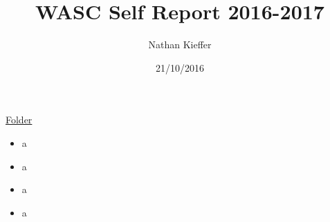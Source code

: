 \documentclass[draft]{report}
\title{WASC Self Report 2016-2017}
\author{Nathan Kieffer}
\date{21/10/2016}
\begin{document}
\AddToShipoutPicture*{\BackgroundPic}
\maketitle


\href{https://drive.google.com/a/cmis.ac.th/folderview?id=0ByVFfrm0zfolWE0yenprdktGVlk&usp=sharing}{Folder}
\begin{itemize}
\item a
\item a
\item a
\item a
\end{itemize}
\end{document}
